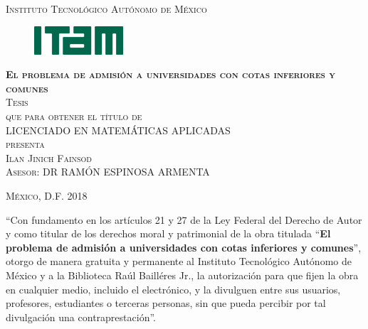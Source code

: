 \documentclass[11pt]{book}
\begin{document}
\begin{titlepage}
\begin{center}

\textsc{\Large Instituto Tecnológico Autónomo de México}\\[4em]

\begin{figure}[h]
\begin{center}
\includegraphics{logo-ITAM_ch.jpg}
\end{center}
\end{figure}

\vspace{4em}

\textsc{\huge \textbf{El problema de admisión a universidades con cotas inferiores y comunes}}\\[4em]

\textsc{\large Tesis}\\[1em]

\textsc{que para obtener el título de}\\[1em]

\textsc{LICENCIADO EN MATEMÁTICAS APLICADAS}\\[1em]

\textsc{presenta}\\[1em]

\textsc{\Large Ilan Jinich Fainsod}\\[1em]

\textsc{\large Asesor: DR RAMÓN ESPINOSA ARMENTA }

\end{center}

\vspace*{\fill}
\textsc{México, D.F. \hspace*{\fill} 2018}

\end{titlepage}



\thispagestyle{empty}
\vspace*{\fill}
\begingroup
``Con fundamento en los artículos 21 y 27 de la Ley Federal del Derecho de Autor y como titular de los derechos moral y patrimonial de la obra titulada ``\textbf{El problema de admisión a universidades con cotas inferiores y comunes}'', otorgo de manera gratuita y permanente al Instituto Tecnológico Autónomo de México y a la Biblioteca Raúl Bailléres Jr., la autorización para que fijen la obra en cualquier medio, incluido el electrónico, y la divulguen entre sus usuarios, profesores, estudiantes o terceras personas, sin que pueda percibir por tal divulgación una contraprestación''.
\end{document}
